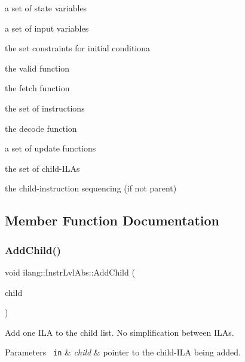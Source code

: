 \begin{DoxyItemize}
\item a set of state variables
\item a set of input variables
\item the set constraints for initial conditiona
\item the valid function
\item the fetch function
\item the set of instructions
\begin{DoxyEnumerate}
\item the decode function
\item a set of update functions
\end{DoxyEnumerate}
\item the set of child-\/\+I\+L\+As
\item the child-\/instruction sequencing (if not parent) 
\end{DoxyItemize}

\subsection{Member Function Documentation}
\mbox{\label{classilang_1_1_instr_lvl_abs_a89241c146f831d68ed0145b6caaabe92}} 
\subsubsection{\texorpdfstring{Add\+Child()}{AddChild()}}
{\footnotesize\ttfamily void ilang\+::\+Instr\+Lvl\+Abs\+::\+Add\+Child (\begin{DoxyParamCaption}\item[{const \mbox{\hyperlink{classilang_1_1_instr_lvl_abs_a743fd98e5ad145d70cb0dabf8db0007c}{Instr\+Lvl\+Abs\+Ptr}}}]{child }\end{DoxyParamCaption})}



Add one I\+LA to the child list. No simplification between I\+L\+As. 


\begin{DoxyParams}[1]{Parameters}
\mbox{\texttt{ in}}  & {\em child} & pointer to the child-\/\+I\+LA being added. \\
\hline
\end{DoxyParams}
\mbox{\label{classilang_1_1_instr_lvl_abs_a5bbf1c23abb1f769394290e977e05df7}} 
